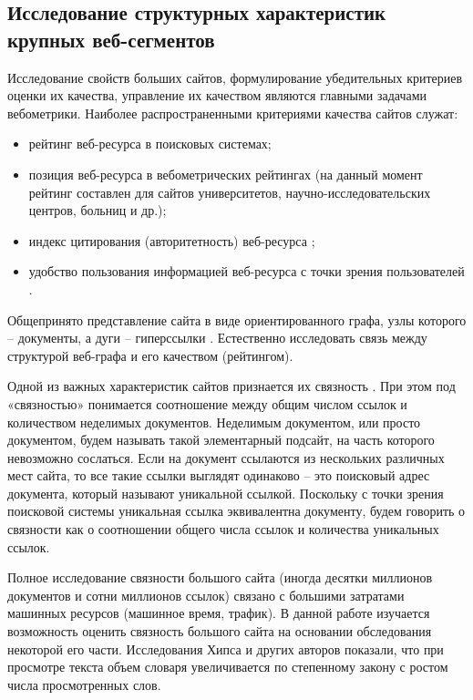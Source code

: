 \subsection{Исследование структурных характеристик крупных веб-сегментов}\label{subsec:ch1/sec4/sub2}

Исследование свойств больших сайтов, формулирование убедительных критериев оценки их качества, управление их качеством являются главными задачами вебометрики. Наиболее распространенными критериями качества сайтов служат:
\begin{itemize}
	\item рейтинг веб-ресурса в поисковых системах;
	\item позиция веб-ресурса в вебометрических рейтингах \cite{RankingWeb} (на данный момент рейтинг составлен для сайтов университетов, научно-исследовательских центров, больниц и др.);
	\item индекс цитирования (авторитетность) веб-ресурса \cite{ThelwallZuccala,Smith,Nicolaisen,OrtegaAguilloCothey};
	\item удобство пользования информацией веб-ресурса с точки зрения пользователей
	\cite{ChevalierDommesMartins,HarperChen,ZengProctorSalvendy,HuntingtonNicholasJamali}.
\end{itemize}

Общепринято представление сайта в виде ориентированного графа, узлы которого -- документы, а дуги -- гиперссылки \cite{BroderKumarMaghoul}. Естественно исследовать связь между структурой веб-графа и его качеством (рейтингом).

Одной из важных характеристик сайтов признается их связность \cite{Thelwall,ThelwallWilkinsonMusgrove}. При этом под «связностью» понимается соотношение между общим числом ссылок и количеством неделимых документов. Неделимым документом, или просто документом, будем называть такой элементарный подсайт, на часть которого невозможно сослаться. Если на документ ссылаются из нескольких различных мест сайта, то все такие ссылки выглядят одинаково -- это поисковый адрес документа, который называют уникальной ссылкой. Поскольку с точки зрения поисковой системы уникальная ссылка эквивалентна документу, будем говорить о связности как о соотношении общего числа ссылок и количества уникальных ссылок.

Полное исследование связности большого сайта (иногда десятки миллионов документов и сотни миллионов ссылок) связано с большими затратами машинных ресурсов (машинное время, трафик). В данной работе изучается возможность оценить связность большого сайта на основании обследования некоторой его части. Исследования Хипса \cite{Heaps} и других авторов \cite{GelbukhSidorov,Zhang,KuboSatoMatsubara} показали, что при просмотре текста объем словаря увеличивается по степенному закону с ростом числа просмотренных слов.

